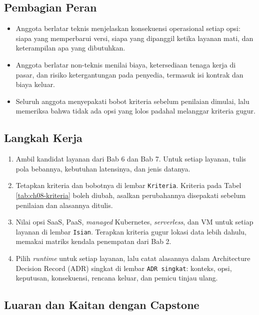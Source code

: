 \subsection*{Pembagian Peran}

\begin{itemize}
  \item Anggota berlatar teknis menjelaskan konsekuensi operasional setiap opsi: siapa yang
        memperbarui versi, siapa yang dipanggil ketika layanan mati, dan keterampilan apa yang
        dibutuhkan.
  \item Anggota berlatar non-teknis menilai biaya, ketersediaan tenaga kerja di pasar, dan risiko
        ketergantungan pada penyedia, termasuk isi kontrak dan biaya keluar.
  \item Seluruh anggota menyepakati bobot kriteria sebelum penilaian dimulai, lalu memeriksa bahwa
        tidak ada opsi yang lolos padahal melanggar kriteria gugur.
\end{itemize}

\subsection*{Langkah Kerja}

\begin{enumerate}
  \item Ambil kandidat layanan dari Bab 6 dan Bab 7. Untuk setiap layanan, tulis pola bebannya,
        kebutuhan latensinya, dan jenis datanya.
  \item Tetapkan kriteria dan bobotnya di lembar \texttt{Kriteria}. Kriteria pada Tabel
        \ref{tab:ch08-kriteria} boleh diubah, asalkan perubahannya disepakati sebelum penilaian
        dan alasannya ditulis.
  \item Nilai opsi SaaS, PaaS, \textit{managed} Kubernetes, \textit{serverless}, dan VM untuk setiap
        layanan di lembar \texttt{Isian}. Terapkan kriteria gugur lokasi data lebih dahulu,
        memakai matriks kendala penempatan dari Bab 2.
  \item Pilih \textit{runtime} untuk setiap layanan, lalu catat alasannya dalam Architecture
        Decision Record (ADR) singkat di lembar \texttt{ADR singkat}: konteks, opsi, keputusan,
        konsekuensi, rencana keluar, dan pemicu tinjau ulang.
\end{enumerate}

\subsection*{Luaran dan Kaitan dengan Capstone}

